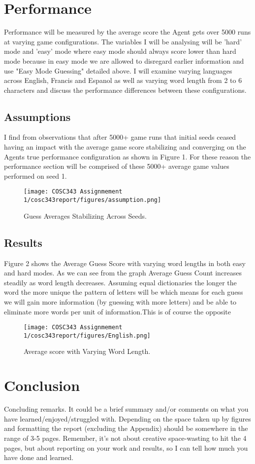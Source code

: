 \documentclass[12pt]{article}
\begin{document}
\section{Performance}

Performance will be measured by the average score the Agent gets over 5000 runs at varying game configurations. The variables I will be analysing will be 'hard' mode and 'easy' mode where easy mode should always score lower than hard mode because in easy mode we are allowed to disregard earlier information and use "Easy Mode Guessing" detailed above. I will examine varying languages across English, Francis and Espanol as well as varying word length from 2 to 6 characters and discuss the performance differences between these configurations.
\subsection{Assumptions}
 I find from observations that after 5000+ game runs that initial seeds ceased having an impact with the average game score stabilizing and converging on the Agents true performance configuration as shown in Figure 1. For these reason the performance section will be comprised of these 5000+ average game values performed on seed 1.
\begin{figure}[h]


\centering
\texttt{[image: COSC343 Assignmement 1/cosc343report/figures/assumption.png]}
\caption{\label{fig:assumption}Guess Averages Stabilizing Across Seeds.}
\end{figure}

\subsection{Results}

Figure 2 shows the Average Guess Score with varying word lengths in both easy and hard modes. As we can see from the graph Average Guess Count increases steadily as word length decreases. Assuming equal dictionaries the longer the word the more unique the pattern of letters will be which means for each guess we will gain more information (by guessing with more letters) and be able to eliminate more words per unit of information.This is of course the opposite

\begin{figure}[h]
\centering
\texttt{[image: COSC343 Assignmement 1/cosc343report/figures/English.png]}
\caption{\label{fig:assumption}Average score with Varying Word Length.}
\end{figure}


\section{Conclusion}

Concluding remarks.  It could be a brief summary and/or comments on what you have learned/enjoyed/struggled with.      Depending on the space taken up by figures and formatting the report (excluding the Appendix) should be somewhere in the range of 3-5 pages.  Remember, it's not about creative space-wasting to hit the 4 pages, but about reporting on your work and results, so I can tell how much you have done and learned.
\end{document}
